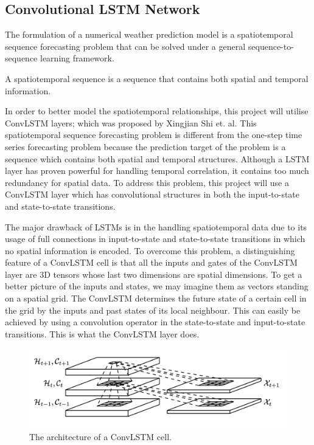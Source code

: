 \subsection{Convolutional LSTM Network}
The formulation of a numerical weather prediction model is a spatiotemporal sequence forecasting problem that can be solved under a general sequence-to-sequence learning framework. 

\begin{definition}
A spatiotemporal sequence is a sequence that contains both spatial and temporal information.
\end{definition}

In order to better model the spatiotemporal relationships, this project will utilise ConvLSTM layers; which was proposed by Xingjian Shi et. al\cite{convlstm}. This spatiotemporal sequence forecasting problem is different from the one-step time series forecasting problem because the prediction target of the problem is a sequence which contains both spatial and temporal structures. Although a LSTM layer has proven powerful for handling temporal correlation, it contains too much redundancy for spatial data. To address this problem, this project will use a ConvLSTM layer which has convolutional structures in both the input-to-state and state-to-state transitions\cite{convlstm}.

The major drawback of LSTMs is in the handling spatiotemporal data due to its usage of full connections in input-to-state and state-to-state transitions in which no spatial information is encoded. To overcome this problem, a distinguishing feature of a ConvLSTM cell is that all the inputs and gates of the ConvLSTM layer are 3D tensors whose last two dimensions are spatial dimensions. To get a better picture of the inputs and states, we may imagine them as vectors standing on a spatial grid. The ConvLSTM determines the future state of a certain cell in the grid by the inputs and past states of its local neighbour. This can easily be achieved by using a convolution operator in the state-to-state and input-to-state transitions\cite{convlstm}. This is what the ConvLSTM layer does.

\begin{figure}[H]
    \centering
    \includegraphics[width=.8\linewidth]{Images/convlstm.png}
    \caption{The architecture of a ConvLSTM cell.}
\end{figure}

